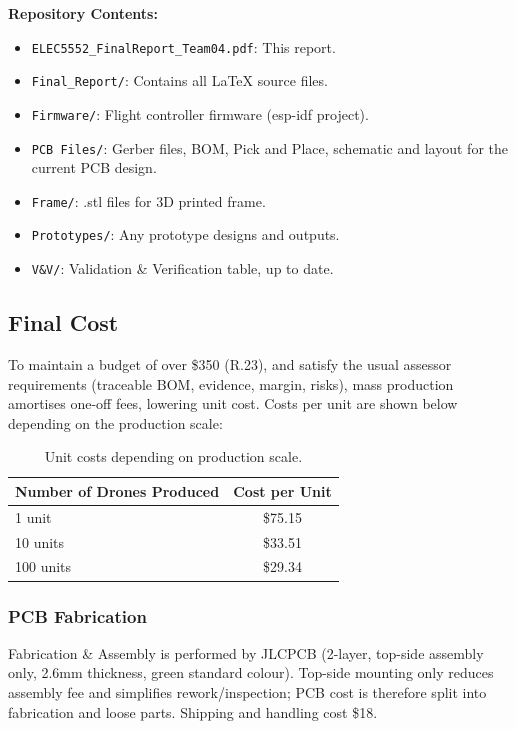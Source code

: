 \textbf{Repository Contents:}
\begin{itemize}
    \item \texttt{ELEC5552\_FinalReport\_Team04.pdf}: This report.
    \item \texttt{Final\_Report/}: Contains all \LaTeX{} source files.
    \item \texttt{Firmware/}: Flight controller firmware (\gls{esp-idf} project).
    \item \texttt{PCB Files/}: Gerber files, BOM, Pick and Place, schematic and layout for the current PCB design.
    \item \texttt{Frame/}: .stl files for 3D printed frame.
    \item \texttt{Prototypes/}: Any prototype designs and outputs.
    \item \texttt{V\&V/}: Validation \& Verification table, up to date.
\end{itemize}

\pagebreak
\subsection{Final Cost}

To maintain a budget of over \$350 (R.23), and satisfy the usual assessor requirements (traceable BOM, evidence, margin, risks), mass production amortises one-off fees, lowering unit cost. Costs per unit are shown below depending on the production scale:

\begin{table}[H]
\centering
\begin{tabular}{l c}
\toprule
\textbf{Number of Drones Produced} & \textbf{Cost per Unit} \\
\midrule
1 unit   & \$75.15 \\
10 units & \$33.51 \\
100 units & \$29.34 \\
\bottomrule
\end{tabular}
\caption{Unit costs depending on production scale.}
\end{table}

\subsubsection{PCB Fabrication}

Fabrication \& Assembly is performed by JLCPCB (2-layer, top-side assembly only, 2.6mm thickness, green standard colour). Top-side mounting only reduces assembly fee and simplifies rework/inspection; PCB cost is therefore split into fabrication and loose parts. Shipping and handling cost \$18.

